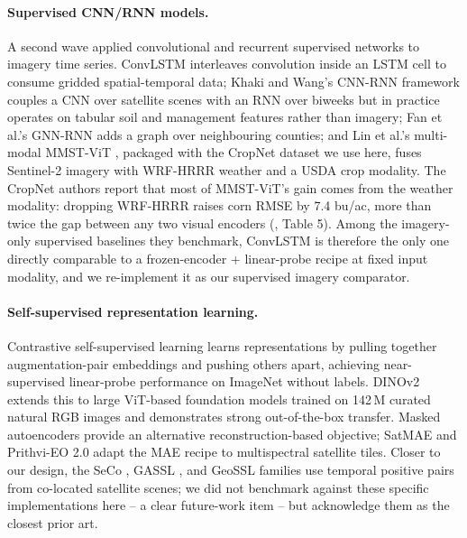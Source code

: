 \documentclass{article}
\begin{document}
\paragraph{Supervised CNN/RNN models.}
A second wave applied convolutional and recurrent supervised networks to
imagery time series. ConvLSTM \citep{shi2015convlstm} interleaves convolution
inside an LSTM cell to consume gridded spatial-temporal data; Khaki and Wang's
CNN-RNN framework \citep{khaki2020cnnrnn} couples a CNN over satellite scenes
with an RNN over biweeks but in practice operates on tabular soil and
management features rather than imagery; Fan et al.'s GNN-RNN
\citep{fan2022gnnrnn} adds a graph over neighbouring counties; and Lin et al.'s
multi-modal MMST-ViT \citep{lin2024cropnet}, packaged with the CropNet dataset
we use here, fuses Sentinel-2 imagery with WRF-HRRR weather and a USDA crop
modality. The CropNet authors report that most of MMST-ViT's gain comes from
the weather modality: dropping WRF-HRRR raises corn RMSE by 7.4 bu/ac, more than
twice the gap between any two visual encoders (\citealp{lin2024cropnet}, Table
5). Among the imagery-only supervised baselines they benchmark, ConvLSTM is
therefore the only one directly comparable to a frozen-encoder + linear-probe
recipe at fixed input modality, and we re-implement it as our supervised
imagery comparator.

\paragraph{Self-supervised representation learning.}
Contrastive self-supervised learning \citep{chen2020simclr,he2020moco} learns
representations by pulling together augmentation-pair embeddings and pushing
others apart, achieving near-supervised linear-probe performance on ImageNet
without labels. DINOv2 \citep{oquab2024dinov2} extends this to large
ViT-based foundation models trained on 142\,M curated natural RGB images and
demonstrates strong out-of-the-box transfer. Masked autoencoders
\citep{he2022mae} provide an alternative reconstruction-based objective;
SatMAE \citep{cong2022satmae} and Prithvi-EO 2.0 \citep{jakubik2023prithvi}
adapt the MAE recipe to multispectral satellite tiles. Closer to our design,
the SeCo \citep{manas2021seco}, GASSL \citep{ayush2021gassl}, and GeoSSL
families use temporal positive pairs from co-located satellite scenes; we did
not benchmark against these specific implementations here -- a clear future-work
item -- but acknowledge them as the closest prior art.
\end{document}
